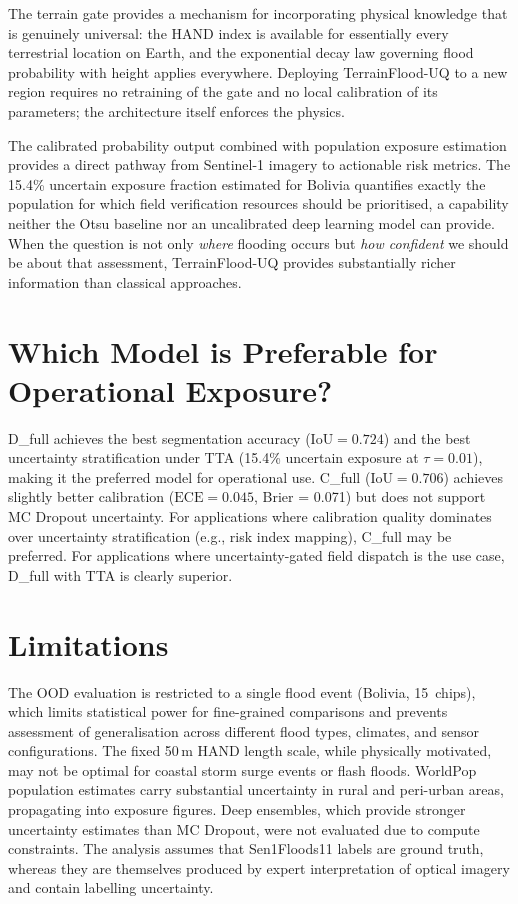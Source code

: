 \documentclass[12pt,oneside]{report}
\newcommand{\IoU}{\mathrm{IoU}}
\newcommand{\ECE}{\mathrm{ECE}}
\begin{document}
The terrain gate provides a mechanism for incorporating physical knowledge that
is genuinely universal: the HAND index is available for essentially every
terrestrial location on Earth, and the exponential decay law governing flood
probability with height applies everywhere.
Deploying TerrainFlood-UQ to a new region requires no retraining of the gate
and no local calibration of its parameters; the architecture itself enforces
the physics.

The calibrated probability output combined with population exposure estimation
provides a direct pathway from Sentinel-1 imagery to actionable risk metrics.
The 15.4\% uncertain exposure fraction estimated for Bolivia quantifies exactly
the population for which field verification resources should be prioritised,
a capability neither the Otsu baseline nor an uncalibrated deep learning model
can provide.
When the question is not only \emph{where} flooding occurs but \emph{how
confident} we should be about that assessment, TerrainFlood-UQ provides
substantially richer information than classical approaches.

\section{Which Model is Preferable for Operational Exposure?}

D\_full achieves the best segmentation accuracy ($\IoU = 0.724$) and the best
uncertainty stratification under TTA (15.4\% uncertain exposure at $\tau =
0.01$), making it the preferred model for operational use.
C\_full ($\IoU = 0.706$) achieves slightly better calibration ($\ECE = 0.045$,
Brier = 0.071) but does not support MC Dropout uncertainty.
For applications where calibration quality dominates over uncertainty
stratification (e.g., risk index mapping), C\_full may be preferred.
For applications where uncertainty-gated field dispatch is the use case,
D\_full with TTA is clearly superior.

\section{Limitations}

The OOD evaluation is restricted to a single flood event (Bolivia, 15~chips),
which limits statistical power for fine-grained comparisons and prevents
assessment of generalisation across different flood types, climates, and sensor
configurations.
The fixed 50\,m HAND length scale, while physically motivated, may not be
optimal for coastal storm surge events or flash floods.
WorldPop population estimates carry substantial uncertainty in rural and
peri-urban areas, propagating into exposure figures.
Deep ensembles, which provide stronger uncertainty estimates than MC Dropout,
were not evaluated due to compute constraints.
The analysis assumes that Sen1Floods11 labels are ground truth, whereas they
are themselves produced by expert interpretation of optical imagery and contain
labelling uncertainty.
\end{document}
